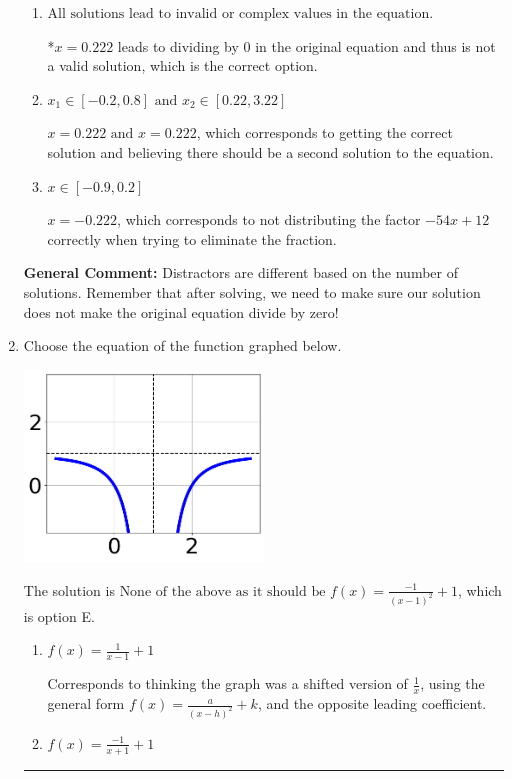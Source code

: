 \documentclass{extbook}[14pt]
\newcommand{\litem}[1]{\item #1

\rule{\textwidth}{0.4pt}}
\begin{document}
\begin{enumerate}
{\begin{enumerate}[label=\Alph*.]
$x = -0.222 \text{ and } x = 0.222$, which corresponds to getting the correct solution and believing there should be a second solution to the equation.
\item \( \text{All solutions lead to invalid or complex values in the equation.} \)

*$x = 0.222$ leads to dividing by 0 in the original equation and thus is not a valid solution, which is the correct option.
\item \( x_1 \in [-0.2, 0.8] \text{ and } x_2 \in [0.22,3.22] \)

$x = 0.222 \text{ and } x = 0.222$, which corresponds to getting the correct solution and believing there should be a second solution to the equation.
\item \( x \in [-0.9,0.2] \)

$x = -0.222$, which corresponds to not distributing the factor $-54x + 12$ correctly when trying to eliminate the fraction.
\end{enumerate}

\textbf{General Comment:} Distractors are different based on the number of solutions. Remember that after solving, we need to make sure our solution does not make the original equation divide by zero!
}
\litem{
Choose the equation of the function graphed below.

\begin{center}
    \includegraphics[width=0.5\textwidth]{../Figures/rationalGraphToEquationCopyA.png}
\end{center}


The solution is \( \text{None of the above as it should be } f(x) = \frac{-1}{(x - 1)^2} + 1 \), which is option E.\begin{enumerate}[label=\Alph*.]
\item \( f(x) = \frac{1}{x - 1} + 1 \)

Corresponds to thinking the graph was a shifted version of $\frac{1}{x}$, using the general form $f(x) = \frac{a}{(x-h)^2}+k$, and the opposite leading coefficient.
\item \( f(x) = \frac{-1}{x + 1} + 1 \)


\end{enumerate}}
\end{enumerate}
\end{document}
